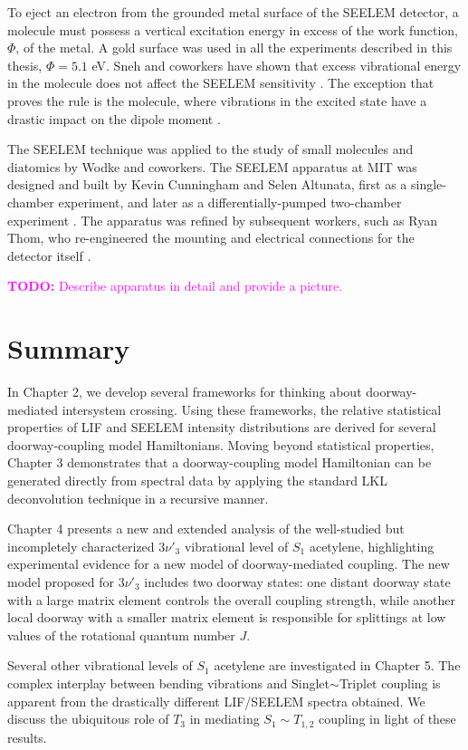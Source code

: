 \documentclass[12pt]{mitthesis}
\newcommand{\TODO} [1]{\textcolor{magenta}{\textbf{TODO:} #1}}
\begin{document}
To eject an electron from the grounded metal surface of the SEELEM
detector, a molecule must possess a vertical excitation energy in
excess of the work function, $\Phi$, of the metal.  A gold surface was
used in all the experiments described in this thesis, $\Phi = 5.1$ eV.
Sneh and coworkers have shown that excess vibrational energy in the
molecule does not affect the SEELEM sensitivity \cite{sneh86}.  The
exception that proves the rule is the  molecule, where
vibrations in the excited state have a drastic impact on the dipole
moment \cite{white05}.

The SEELEM technique was applied to the study of small molecules and
diatomics by Wodke and coworkers.  The SEELEM apparatus at MIT was
designed and built by Kevin Cunningham and Selen Altunata, first as a
single-chamber experiment, and later as a differentially-pumped
two-chamber experiment \cite{cunningham-thesis, altunata-thesis}.  The
apparatus was refined by subsequent workers, such as Ryan Thom, who
re-engineered the mounting and electrical connections for the detector
itself \cite{thom-thesis}.

\TODO{Describe apparatus in detail and provide a picture.}

\section{Summary}

In Chapter 2, we develop several frameworks for thinking about
doorway-mediated intersystem crossing.  Using these frameworks, the
relative statistical properties of LIF and SEELEM intensity
distributions are derived for several doorway-coupling model
Hamiltonians.  Moving beyond statistical properties, Chapter 3
demonstrates that a doorway-coupling model Hamiltonian can be
generated directly from spectral data by applying the standard LKL
deconvolution technique in a recursive manner.

Chapter 4 presents a new and extended analysis of the well-studied but
incompletely characterized $3\nu'_3$ vibrational level of $S_1$
acetylene, highlighting experimental evidence for a new model of
doorway-mediated coupling.  The new model proposed for $3\nu'_3$
includes two doorway states: one distant doorway state with a large
matrix element controls the overall coupling strength, while another
local doorway with a smaller matrix element is responsible for
splittings at low values of the rotational quantum number $J$.

Several other vibrational levels of $S_1$ acetylene are investigated
in Chapter 5.  The complex interplay between bending vibrations and
Singlet$\sim$Triplet coupling is apparent from the drastically
different LIF/SEELEM spectra obtained.  We discuss the ubiquitous role
of $T_3$ in mediating $S_1 \sim T_{1,2}$ coupling in light of these
results.  
\end{document}
